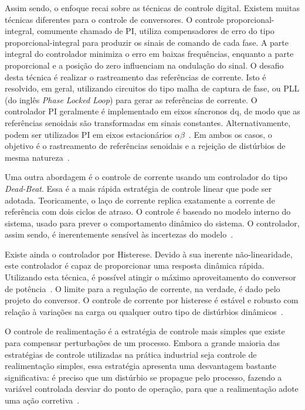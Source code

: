 	Assim sendo, o enfoque recai sobre as técnicas de controle digital. Existem muitas técnicas diferentes para o controle de conversores. O controle proporcional-integral, comumente chamado de PI, utiliza compensadores de erro do tipo proporcional-integral para produzir os sinais de comando de cada fase. A parte integral do controlador minimiza o erro em baixas frequências, enquanto a parte proporcional e a posição do zero influenciam na ondulação do sinal. O desafio desta técnica é realizar o rastreamento das referências de corrente. Isto é resolvido, em geral, utilizando circuitos do tipo malha de captura de fase, ou PLL (do inglês \emph{Phase Locked Loop}) para gerar as referências de corrente. O controlador PI geralmente é implementado em eixos síncronos dq, de modo que as referências senoidais são transformadas em sinais constantes. Alternativamente, podem ser utilizados PI em eixos estacionários $\alpha \beta$~\cite{ref:KAZMIERKOWSKI}. Em ambos os casos, o objetivo é o rastreamento de referências senoidais e a rejeição de distúrbios de mesma natureza~\cite{ref:AREERAK}.

	Uma outra abordagem é o controle de corrente usando um controlador do tipo \emph{Dead-Beat}. Essa é a mais rápida estratégia de controle linear que pode ser adotada. Teoricamente, o laço de corrente replica exatamente a corrente de referência com dois ciclos de atraso. O controle é baseado no modelo interno do sistema, usado para prever o comportamento dinâmico do sistema. O controlador, assim sendo, é inerentemente sensível às incertezas do modelo~\cite{ref:MALESANI}.

	Existe ainda o controlador por Histerese. Devido à sua inerente não-linearidade, este controlador é capaz de proporcionar uma resposta dinâmica rápida. Utilizando esta técnica, é possível atingir o máximo aproveitamento do conversor de potência~\cite{ref:YAO}. O limite para a regulação de corrente, na verdade, é dado pelo projeto do conversor. O controle de corrente por histerese é estável e robusto com relação à variações na carga ou qualquer outro tipo de distúrbios
	dinâmicos~\cite{ref:TENTI}.

	O controle de realimentação é a estratégia de controle mais simples que existe para compensar perturbações de um processo. Embora a grande maioria das estratégias de controle utilizadas na prática industrial seja controle de realimentação simples, essa estratégia apresenta uma desvantagem bastante significativa: é preciso que um distúrbio se propague pelo processo, fazendo a variável controlada desviar do ponto de operação, para que a realimentação adote uma ação corretiva~\cite{ref:SMITH}.

